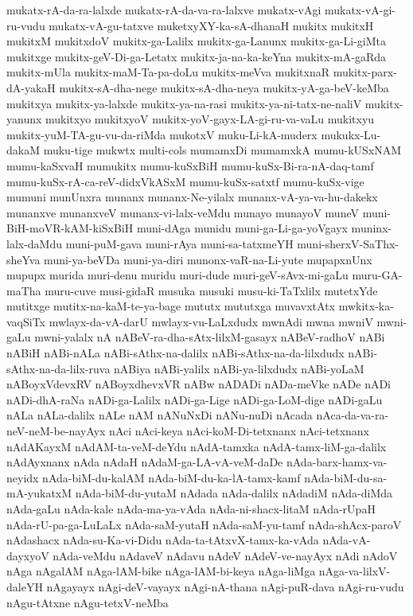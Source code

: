 {mukatx-rA-da-ra-lalxde
mukatx-rA-da-va-ra-lalxve
mukatx-vAgi
mukatx-vA-gi-ru-vudu
mukatx-vA-gu-tatxve
muketxyXY-ka-sA-dhanaH
mukitx
mukitxH
mukitxM
mukitxdoV
mukitx-ga-Lalilx
mukitx-ga-Lanunx
mukitx-ga-Li-giMta
mukitxge
mukitx-geV-Di-ga-Letatx
mukitx-ja-na-ka-keYna
mukitx-mA-gaRda
mukitx-mUla
mukitx-maM-Ta-pa-doLu
mukitx-meVva
mukitxnaR
mukitx-parx-dA-yakaH
mukitx-sA-dha-nege
mukitx-sA-dha-neya
mukitx-yA-ga-beV-keMba
mukitxya
mukitx-ya-lalxde
mukitx-ya-na-rasi
mukitx-ya-ni-tatx-ne-naliV
mukitx-yanunx
mukitxyo
mukitxyoV
mukitx-yoV-gayx-LA-gi-ru-va-vaLu
mukitxyu
mukitx-yuM-TA-gu-vu-da-riMda
mukotxV
muku-Li-kA-muderx
mukukx-Lu-dakaM
muku-tige
mukwtx
multi-cols
mumamxDi
mumamxkA
mumu-kUSxNAM
mumu-kaSxvaH
mumukitx
mumu-kuSxBiH
mumu-kuSx-Bi-ra-nA-daq-tamf
mumu-kuSx-rA-ca-reV-didxVkASxM
mumu-kuSx-satxtf
mumu-kuSx-vige
mumuni
munUnxra
munanx
munanx-Ne-yilalx
munanx-vA-ya-va-hu-dakekx
munanxve
munanxveV
munanx-vi-lalx-veMdu
munayo
munayoV
muneV
muni-BiH-moVR-kAM-kiSxBiH
muni-dAga
munidu
muni-ga-Li-ga-yoVgayx
muninx-lalx-daMdu
muni-puM-gava
muni-rAya
muni-sa-tatxmeYH
muni-sherxV-SaThx-sheYva
muni-ya-beVDa
muni-ya-diri
munonx-vaR-na-Li-yute
mupapxnUnx
mupupx
murida
muri-denu
muridu
muri-dude
muri-geV-sAvx-mi-gaLu
muru-GA-maTha
muru-cuve
musi-gidaR
musuka
musuki
musu-ki-TaTxlilx
mutetxYde
mutitxge
mutitx-na-kaM-te-ya-bage
mututx
mututxga
muvavxtAtx
mwkitx-ka-vaqSiTx
mwlayx-da-vA-darU
mwlayx-vu-LaLxdudx
mwnAdi
mwna
mwniV
mwni-gaLu
mwni-yalalx
nA
nABeV-ra-dha-sAtx-lilxM-gasayx
nABeV-radhoV
nABi
nABiH
nABi-nALa
nABi-sAthx-na-dalilx
nABi-sAthx-na-da-lilxdudx
nABi-sAthx-na-da-lilx-ruva
nABiya
nABi-yalilx
nABi-ya-lilxdudx
nABi-yoLaM
nABoyxVdevxRV
nABoyxdhevxVR
nABw
nADADi
nADa-meVke
nADe
nADi
nADi-dhA-raNa
nADi-ga-Lalilx
nADi-ga-Lige
nADi-ga-LoM-dige
nADi-gaLu
nALa
nALa-dalilx
nALe
nAM
nANuNxDi
nANu-nuDi
nAcada
nAca-da-va-ra-neV-neM-be-nayAyx
nAci
nAci-keya
nAci-koM-Di-tetxnanx
nAci-tetxnanx
nAdAKayxM
nAdAM-ta-veM-deYdu
nAdA-tamxka
nAdA-tamx-liM-ga-dalilx
nAdAyxnanx
nAda
nAdaH
nAdaM-ga-LA-vA-veM-daDe
nAda-barx-hamx-va-neyidx
nAda-biM-du-kalAM
nAda-biM-du-ka-lA-tamx-kamf
nAda-biM-du-sa-mA-yukatxM
nAda-biM-du-yutaM
nAdada
nAda-dalilx
nAdadiM
nAda-diMda
nAda-gaLu
nAda-kale
nAda-ma-ya-vAda
nAda-ni-shacx-litaM
nAda-rUpaH
nAda-rU-pa-ga-LuLaLx
nAda-saM-yutaH
nAda-saM-yu-tamf
nAda-shAcx-paroV
nAdashacx
nAda-su-Ka-vi-Didu
nAda-ta-tAtxvX-tamx-ka-vAda
nAda-vA-dayxyoV
nAda-veMdu
nAdaveV
nAdavu
nAdeV
nAdeV-ve-nayAyx
nAdi
nAdoV
nAga
nAgalAM
nAga-lAM-bike
nAga-lAM-bi-keya
nAga-liMga
nAga-va-lilxV-daleYH
nAgayayx
nAgi-deV-vayayx
nAgi-nA-thana
nAgi-puR-dava
nAgi-ru-vudu
nAgu-tAtxne
nAgu-tetxV-neMba
}
